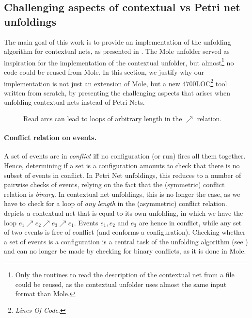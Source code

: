 \documentclass[11pt,a4paper]{article}
\begin{document}
\subsection{Challenging aspects of contextual vs Petri net unfoldings}

The main goal of this work is to provide an implementation of the unfolding
algorithm for contextual nets, as presented in .  The Mole
unfolder  served as inspiration for the implementation of the
contextual unfolder, but almost\footnote{Only the routines to read the
description of the contextual net from a file could be reused, as the
contextual unfolder uses almost the same input format than Mole.} no code could
be reused from Mole.  In this section, we justify why our implementation is not
just an extension of Mole, but a new 4700LOC\footnote{\textit{Lines Of Code}.}
tool written from scratch, by presenting the challenging aspects that arises
when unfolding contextual nets instead of Petri Nets.

\begin{figure}
\caption{Read arcs can lead to loops of arbitrary length in the $\nearrow$
relation.}
\label{fig:read.arcs}
\end{figure}

\paragraph{Conflict relation on events.}  A set of events are in
\emph{conflict} iff no configuration (or run) fires all them together.  Hence,
determining if a set is a configuration amounts to check that there is no
subset of events in conflict.  In Petri Net unfoldings, this reduces to a
number of pairwise checks of events, relying on the fact that the (symmetric)
conflict relation is \emph{binary}.  In contextual net unfoldings, this is no
longer the case, as we have to check for a loop of \emph{any length} in the
(asymmetric) conflict relation.   depicts a contextual net that
is equal to its own unfolding, in which we have the loop $e_1 \nearrow e_2
\nearrow e_3 \nearrow e_1$.  Events $e_1, e_2$ and $e_3$ are hence in conflict,
while any set of two events is free of conflict (and conforms a configuration).
Checking whether a set of events is a configuration is a central task of the
unfolding algorithm (see ) and can no longer be made by
checking for binary conflicts, as it is done in Mole.
\end{document}
